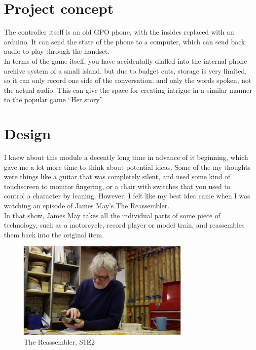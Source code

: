 \documentclass[12pt]{article}
\begin{document}
\maketitle

\section{Project concept} %
The controller itself is an old GPO phone, with the insides replaced with an arduino. It can send the state of the phone to a computer,
which can send back audio to play through the handset.\\
In terms of the game itself, you have accidentally dialled into the internal phone archive system of a small island,
but due to budget cuts, storage is very limited, so it can only record one side of the conversation, and only the words spoken, not the actual audio.
This can give the space for creating intrigue in a similar manner to the popular game ``Her story''

\FloatBarrier
\section{Design} %
I knew about this module a decently long time in advance of it beginning, 
which gave me a lot more time to think about potential ideas. 
Some of the my thoughts were things like a guitar that was completely silent, 
and used some kind of touchscreen to monitor fingering, 
or a chair with switches that you used to control a character by leaning.
However, I felt like my best idea came when I was watching an episode of James May's The Reassembler.\\
In that show, James May takes all the individual parts of some piece of technology, 
such as a motorcycle, record player or model train, 
and reassembles them back into the original item.\\

\begin{figure}[h]
    \centering
    \includegraphics[width=0.75\textwidth]{TheReassembler}
    \caption{The Reassembler, S1E2}
\end{figure}
\end{document}
